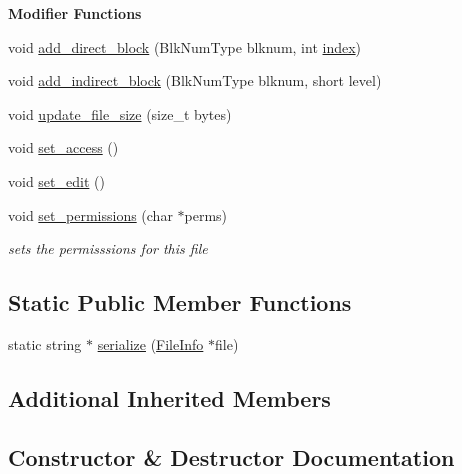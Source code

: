 \begin{Indent}{\bf Modifier Functions}\par
\begin{DoxyCompactItemize}
\item 
void \hyperlink{classFileInfo_a1537d2ac2b5c170d144911c8337c81bc}{add\+\_\+direct\+\_\+block} (Blk\+Num\+Type blknum, int \hyperlink{structindex}{index})
\item 
void \hyperlink{classFileInfo_a074956f43b5a6900205a541dbeaeb8c5}{add\+\_\+indirect\+\_\+block} (Blk\+Num\+Type blknum, short level)
\item 
void \hyperlink{classFileInfo_a3c548a8dfcb6530bfef7551ac24ca473}{update\+\_\+file\+\_\+size} (size\+\_\+t bytes)
\item 
void \hyperlink{classFileInfo_aacaeadeeb41726f8cbea0b7cb1ff6a22}{set\+\_\+access} ()
\item 
void \hyperlink{classFileInfo_a05eb10c6804660ecd47e556c27ecd019}{set\+\_\+edit} ()
\item 
void \hyperlink{classFileInfo_a377208012195dba0b24723837f6db39f}{set\+\_\+permissions} (char $\ast$perms)
\begin{DoxyCompactList}\small\item\em sets the permisssions for this file \end{DoxyCompactList}\end{DoxyCompactItemize}
\end{Indent}
\subsection*{Static Public Member Functions}
\begin{DoxyCompactItemize}
\item 
static string $\ast$ \hyperlink{classFileInfo_a64fc62c3e376dfd61088932d8b793589}{serialize} (\hyperlink{classFileInfo}{File\+Info} $\ast$file)
\end{DoxyCompactItemize}
\subsection*{Additional Inherited Members}


\subsection{Constructor \& Destructor Documentation}
